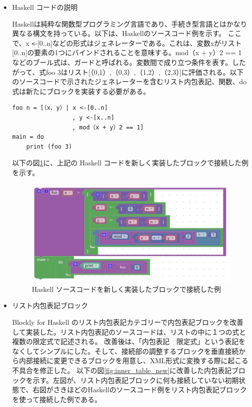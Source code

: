 \documentclass{risepaper}
\begin{document}
\begin{itemize}

\item Haskell コードの説明

Haskellは純粋な関数型プログラミング言語であり、手続き型言語とはかなり異なる構文を持っている。以下は、Haskellのソースコード例を示す。
ここで、x \verb|<|-[0..n]などの形式はジェネレーターである。これは、変数xがリスト[0..n]の要素の1つにバインドされることを意味する。mod（x + y）2 == 1などのブール式は、ガードと呼ばれる。変数間で成り立つ条件を表す。したがって、式foo 3はリスト[（0,1）,（0,3）,（1,2）,（2,3）]に評価される。以下のソースコードで示されたジェネレーターを含むリスト内包表記、関数、do式は新たにブロックを実装する必要がある。

\begin{lstlisting}[basicstyle=\ttfamily\footnotesize]
foo n = [（x、y）| x <-[0..n]
                 , y <-[x..n]
                 , mod（x + y）2 == 1]
main = do
    print (foo 3)
\end{lstlisting}

以下の図\ref{fig:haskell_blocks_example}に、上記の Haskell コードを新しく実装したブロックで接続した例を示す。

\begin{figure}[h]
\begin{center}
\includegraphics[scale=0.8]{img/haskell_blocks_example.PNG}
\caption{Haskell ソースコードを新しく実装したブロックで接続した例}%
\label{fig:haskell_blocks_example}
\end{center}%
\end{figure}%

\item リスト内包表記ブロック

Blockly for Haskell のリスト内包表記カテゴリーで内包表記ブロックを改善して実装した。リスト内包表記のソースコードは、リストの中に１つの式と複数の限定式で記述される。
改善後は、「内包表記　限定式」という表記をなくしてシンプルにした。そして、接続部の調整するブロックを垂直接続から内部接続に変更できるブロックを用意し、XML形式に変換する際に起こる不具合を修正した。
以下の図\ref{fig:inner_table_new}に改善した内包表記ブロックを示す。左図が、リスト内包表記ブロックに何も接続していない初期状態で、右図がさきほどのHaskellのソースコード例をリスト内包表記ブロックを使って接続した例である。



\end{itemize}
\end{document}
